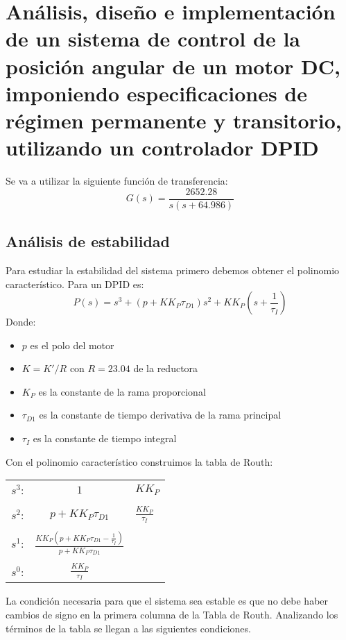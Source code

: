 \documentclass[a4paper]{article}
\begin{document}
\section{Análisis, diseño e implementación de un sistema de control de la posición angular de un motor DC, imponiendo especificaciones de régimen permanente y transitorio, utilizando un controlador D\textbar PID}
Se va a utilizar la siguiente función de transferencia:
\begin{equation}
G(s)=\frac{2652.28}{s(s+64.986)}
\end{equation}
\subsection{Análisis de estabilidad \label{estabilidad}} 
Para estudiar la estabilidad del sistema primero debemos obtener el polinomio característico. Para un D\textbar PID es:
\begin{equation}
P(s)=s^3+(p+K K_P\tau_{D1})s^2+K K_P(s+\frac{1}{\tau_I})
\end{equation}
Donde:
\begin{itemize}
	\item $p$ es el polo del motor
	\item $K=K'/R$ con $R=23.04$ de la reductora
	\item $K_P$ es la constante de la rama proporcional
	\item $\tau_{D1}$ es la constante de tiempo derivativa de la rama principal
	\item $\tau_I$ es la constante de tiempo integral
\end{itemize}

Con el polinomio característico construimos la tabla de Routh:

\begin{tabular}{ccl}
	$s^3$: & $1$ & $K K_P$ \\ \\
	$s^2$: & $p+K K_P \tau_{D1}$ & $\displaystyle\frac{K K_P}{\tau_I}$ \\ \\
	$s^1$: & $\displaystyle\frac{K K_P (p+K K_P \tau_{D1} -\frac{1}{\tau_I})}{p+K K_P \tau_{D1}}$ & \\ \\
	$s^0$: & $\displaystyle\frac{K K_P}{\tau_I}$ &
\end{tabular}


La condición necesaria para que el sistema sea estable es que no debe haber cambios de signo en la primera columna de la Tabla de Routh. Analizando los términos de la tabla se llegan a las siguientes condiciones.
\end{document}
